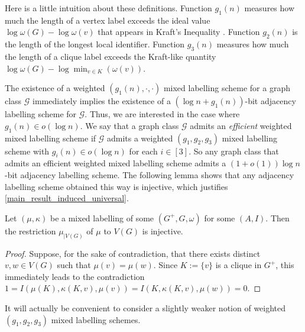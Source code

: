 \documentclass{patmorin}
\newcommand{\defin}[1]{\emph{\textcolor{brightmaroon}{#1}}}
\begin{document}
Here is a little intuition about these definitions. Function $g_1(n)$ measures how much the length of a vertex label exceeds the ideal value $\log \omega(G) - \log\omega(v)$ that appears in Kraft's Inequality \cite{Kraft1949}. Function $g_2(n)$ is the length of the longest local identifier. Function $g_3(n)$ measures how much the length of a clique label exceeds the Kraft-like quantity $\log\omega(G)-\log\min_{v\in K}(\omega(v))$.


The existence of a weighted $(g_1(n),\cdot,\cdot)$ mixed labelling scheme for a graph class $\mathcal{G}$ immediately implies the existence of a $(\log n+g_1(n))$-bit adjacency labelling scheme for $\mathcal{G}$. Thus, we are interested in the case where $g_1(n)\in o(\log n)$. We say that a graph class $\mathcal{G}$ admits an \defin{efficient} weighted mixed labelling scheme if $\mathcal{G}$ admits a weighted $(g_1,g_2,g_3)$ mixed labelling scheme with $g_i(n)\in o(\log n)$ for each $i\in [3]$. So any graph class that admits an efficient weighted mixed labelling scheme admits a $(1+o(1))\log n$-bit adjacency labelling scheme. The following lemma shows that any adjacency labelling scheme obtained this way is injective, which justifies \cref{main_result_induced_universal}.

\begin{lem}
  Let $(\mu,\kappa)$ be a mixed labelling of some $(G^+,G,\omega)$ for some $(A,I)$. Then the restriction $\mu_{|V(G)}$ of $\mu$ to $V(G)$ is injective.
\end{lem}

\begin{proof}
  Suppose, for the sake of contradiction, that there exists distinct $v,w\in V(G)$ such that $\mu(v)=\mu(w)$. Since  $K:=\{v\}$ is a clique in $G^+$, this immediately leads to the contradiction
  $1=I(\mu(K),\kappa(K,v),\mu(v))=I(K,\kappa(K,v),\mu(w))=0$.
\end{proof}



It will actually be convenient to consider a slightly weaker notion of weighted $(g_1,g_2,g_3)$ mixed labelling schemes.
\end{document}
